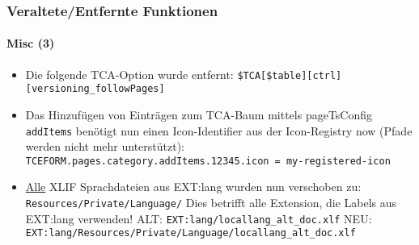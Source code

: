 \begin{frame}[fragile]
	\frametitle{Veraltete/Entfernte Funktionen}
	\framesubtitle{Misc (3)}


	\begin{itemize}

		\item Die folgende TCA-Option wurde entfernt:\newline
			\texttt{\$TCA[\$table][ctrl][versioning\_followPages]}

		\item Das Hinzufügen von Einträgen zum TCA-Baum mittels pageTsConfig \texttt{addItems} benötigt nun einen Icon-Identifier aus der Icon-Registry now (Pfade werden nicht mehr unterstützt):\newline
			\smaller
				\texttt{TCEFORM.pages.category.addItems.12345.icon = my-registered-icon}
			\normalsize

		\item \underline{Alle} XLIF Sprachdateien aus EXT:lang wurden nun verschoben zu:\newline
			\texttt{Resources/Private/Language/}\newline
			Dies betrifft alle Extension, die Labels aus EXT:lang verwenden!\newline
			\smaller
				ALT: \texttt{EXT:lang/locallang\_alt\_doc.xlf}\newline
				NEU: \texttt{EXT:lang/Resources/Private/Language/locallang\_alt\_doc.xlf}
			\normalsize

	\end{itemize}

\end{frame}







